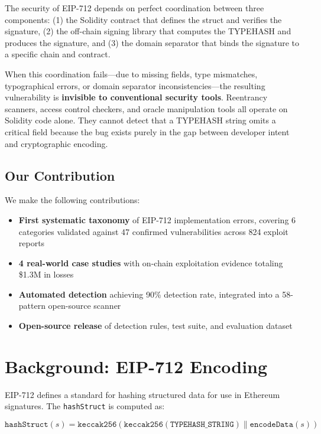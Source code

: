 \documentclass[runningheads]{llncs}
\begin{document}
The security of EIP-712 depends on perfect coordination between three components: (1) the Solidity contract that defines the struct and verifies the signature, (2) the off-chain signing library that computes the TYPEHASH and produces the signature, and (3) the domain separator that binds the signature to a specific chain and contract.

When this coordination fails---due to missing fields, type mismatches, typographical errors, or domain separator inconsistencies---the resulting vulnerability is \textbf{invisible to conventional security tools}. Reentrancy scanners, access control checkers, and oracle manipulation tools all operate on Solidity code alone. They cannot detect that a TYPEHASH string omits a critical field because the bug exists purely in the gap between developer intent and cryptographic encoding.

\subsection{Our Contribution}

We make the following contributions:
\begin{itemize}
    \item \textbf{First systematic taxonomy} of EIP-712 implementation errors, covering 6 categories validated against 47 confirmed vulnerabilities across 824 exploit reports
    \item \textbf{4 real-world case studies} with on-chain exploitation evidence totaling \$1.3M in losses
    \item \textbf{Automated detection} achieving 90\% detection rate, integrated into a 58-pattern open-source scanner
    \item \textbf{Open-source release} of detection rules, test suite, and evaluation dataset
\end{itemize}

\section{Background: EIP-712 Encoding}

EIP-712 defines a standard for hashing structured data for use in Ethereum signatures. The \texttt{hashStruct} is computed as:

\begin{equation}
    \texttt{hashStruct}(s) = \texttt{keccak256}(\texttt{keccak256}(\texttt{TYPEHASH\_STRING}) \parallel \texttt{encodeData}(s))
\end{equation}
\end{document}
